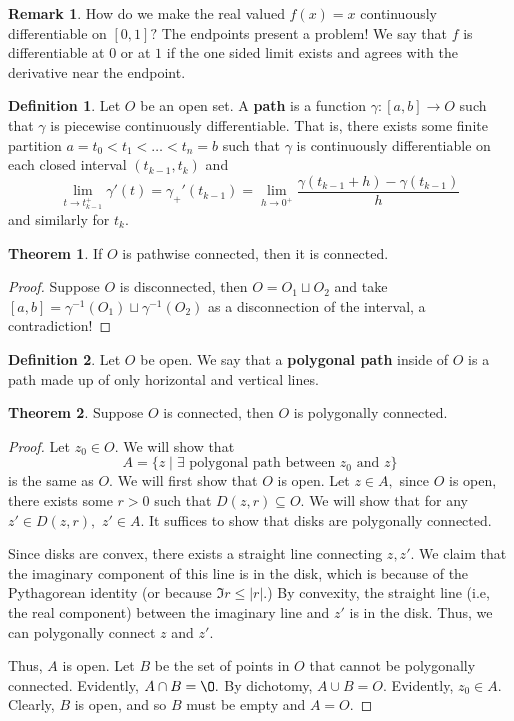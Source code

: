 \documentclass[10pt, oneside]{article}
\theoremstyle{definition}
\newtheorem{thm}{Theorem}
\newtheorem{defn}{Definition}
\newtheorem{rem}{Remark}
\renewcommand{\emptyset}{\O}
\begin{document}
\begin{rem}
    How do we make the real valued $f(x) = x$ continuously differentiable on $[0,1]?$ The endpoints present a problem! We say that $f$ is differentiable at $0$ or at $1$ if the one sided limit exists and agrees with the derivative near the endpoint.
\end{rem}

\begin{defn}
    Let $O$ be an open set. A \textbf{path} is a function $\gamma: [a,b] \to O$ such that $\gamma$ is piecewise continuously differentiable. That is, there exists some finite partition $a = t_0 < t_1 < \dots < t_n = b$ such that $\gamma$ is continuously differentiable on each closed interval $(t_{k-1}, t_k)$ and 
    \[\lim_{t \to t_{k-1}^+} \gamma'(t) = \gamma_+'(t_{k-1}) = \lim_{h\to 0^+} \frac{\gamma(t_{k-1} +h) - \gamma(t_{k-1})}{h}\] and similarly for $t_k.$
\end{defn}

\begin{thm}
    If $O$ is pathwise connected, then it is connected.
\end{thm}
\begin{proof}
    Suppose $O$ is disconnected, then $O = O_1 \sqcup O_2$ and take $[a,b] = \gamma^{-1}(O_1) \sqcup \gamma^{-1}(O_2)$ as a disconnection of the interval, a contradiction!
\end{proof}

\begin{defn}
    Let $O$ be open. We say that a \textbf{polygonal path} inside  of $O$ is a path made up of only horizontal and vertical lines. 
\end{defn}

\begin{thm}
    Suppose $O$ is connected, then $O$ is polygonally connected. 
\end{thm}
\begin{proof}
    Let $z_0 \in O.$ We will show that 
    \[A = \{z \;  | \; \exists \text{ polygonal path between $z_0$ and $z$} \}\] is the same as $O.$ We will first show that $O$ is open. Let $z\in A,$ since $O$ is open, there exists some $r>0$ such that $D(z, r) \subseteq O.$ We will show that for any $z' \in D(z,r),$ $z' \in A.$ It suffices to show that disks are polygonally connected. 

    Since disks are convex, there exists a straight line connecting $z, z'.$ We claim that the imaginary component of this line is in the disk, which is because of the Pythagorean identity (or because $\Im{r} \leq |r|.$) By convexity, the straight line (i.e, the real component) between the imaginary line and $z'$ is in the disk. Thus, we can polygonally connect $z$ and $z'.$

    Thus, $A$ is open. Let $B$ be the set of points in $O$ that cannot be polygonally connected. Evidently, $A \cap B = \emptyset.$ By dichotomy, $A \cup B = O.$ Evidently, $z_0 \in A.$ Clearly, $B$ is open, and so $B$ must be empty and $A = O.$
\end{proof}
\end{document}
